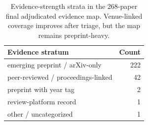 \begin{table}[t]
\centering
\small
\begin{tabular}{lr}
\toprule
\textbf{Evidence stratum} & \textbf{Count} \\ 
\midrule
emerging preprint / arXiv-only & 222 \\ 
peer-reviewed / proceedings-linked & 42 \\ 
preprint with year tag & 2 \\ 
review-platform record & 1 \\ 
other / uncategorized & 1 \\ 
\bottomrule
\end{tabular}
\caption{Evidence-strength strata in the 268-paper final adjudicated evidence map. Venue-linked coverage improves after triage, but the map remains preprint-heavy.}
\label{tab:evidence-strength}
\end{table}
